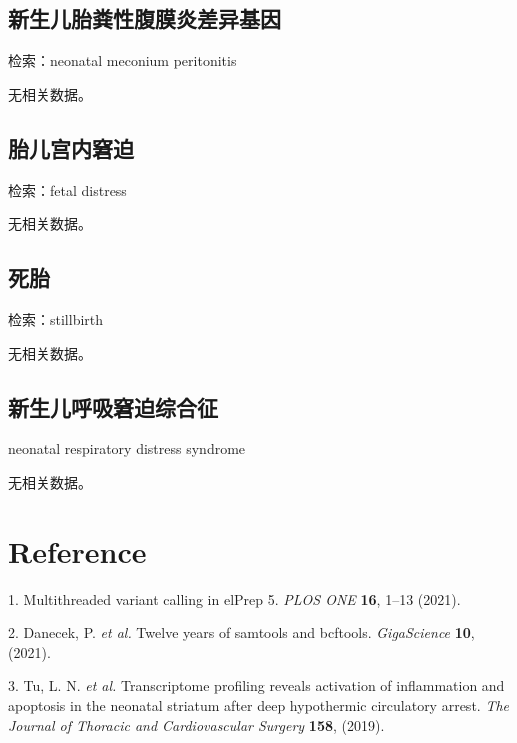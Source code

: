 \documentclass[
]{article}
\newenvironment{cslreferences}%
  {}%
  {\par}
\begin{document}
\hypertarget{ux65b0ux751fux513fux80ceux7caaux6027ux8179ux819cux708eux5deeux5f02ux57faux56e0}{%
\subsection{新生儿胎粪性腹膜炎差异基因}\label{ux65b0ux751fux513fux80ceux7caaux6027ux8179ux819cux708eux5deeux5f02ux57faux56e0}}

检索：neonatal meconium peritonitis

无相关数据。

\hypertarget{ux80ceux513fux5babux5185ux7a98ux8feb}{%
\subsection{胎儿宫内窘迫}\label{ux80ceux513fux5babux5185ux7a98ux8feb}}

检索：fetal distress

无相关数据。

\hypertarget{ux6b7bux80ce}{%
\subsection{死胎}\label{ux6b7bux80ce}}

检索：stillbirth

无相关数据。

\hypertarget{ux65b0ux751fux513fux547cux5438ux7a98ux8febux7efcux5408ux5f81}{%
\subsection{新生儿呼吸窘迫综合征}\label{ux65b0ux751fux513fux547cux5438ux7a98ux8febux7efcux5408ux5f81}}

neonatal respiratory distress syndrome

无相关数据。

\hypertarget{bibliography}{%
\section*{Reference}\label{bibliography}}

\hypertarget{refs}{}
\begin{cslreferences}
\leavevmode\hypertarget{ref-MultithreadedV2021}{}%
1. Multithreaded variant calling in elPrep 5. \emph{PLOS ONE} \textbf{16}, 1--13 (2021).

\leavevmode\hypertarget{ref-TwelveYearsOfDanece2021}{}%
2. Danecek, P. \emph{et al.} Twelve years of samtools and bcftools. \emph{GigaScience} \textbf{10}, (2021).

\leavevmode\hypertarget{ref-TranscriptomePTuLa2019}{}%
3. Tu, L. N. \emph{et al.} Transcriptome profiling reveals activation of inflammation and apoptosis in the neonatal striatum after deep hypothermic circulatory arrest. \emph{The Journal of Thoracic and Cardiovascular Surgery} \textbf{158}, (2019).
\end{cslreferences}
\end{document}
